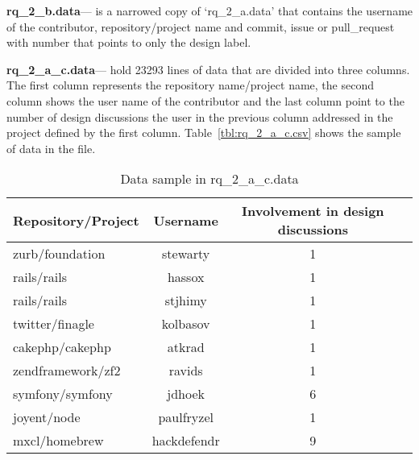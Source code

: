 \noindent\textbf{rq\_2\_b.data}--- is a narrowed copy of `rq\_2\_a.data' that contains the username of the contributor, repository/project name and commit, issue or pull\_request with number that points to only the design label.

\noindent\textbf{rq\_2\_a\_c.data}--- hold 23293 lines of data that are divided into three columns. The first column represents the repository name/project name, the second column shows the user name of the contributor and the last column point to the number of design discussions the user in the previous column addressed in the project defined by the first column. Table~\ref{tbl:rq_2_a_c.csv} shows the sample of data in the file.  
\begin{table*}
	\centering
	\caption{Data sample in rq\_2\_a\_c.data}
	\label{tbl:rq_2_a_c.data}
	\begin{tabular}{lccc} 
		\toprule
		\textbf{Repository/Project} & \textbf{Username} & \textbf{Involvement in design discussions}   \\
		\midrule
		zurb/foundation & stewarty & 1 \\
		rails/rails & hassox & 1 \\
		rails/rails & stjhimy & 1 \\
		twitter/finagle & kolbasov & 1 \\
		cakephp/cakephp & atkrad & 1 \\
		zendframework/zf2 & ravids & 1 \\
		symfony/symfony & jdhoek & 6 \\
		joyent/node & paulfryzel & 1 \\
		mxcl/homebrew & hackdefendr & 9 \\
		\bottomrule
	\end{tabular}
\end{table*}

   